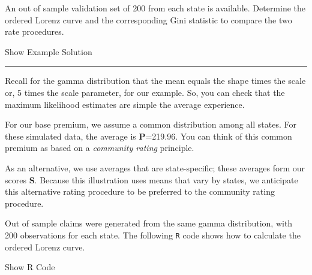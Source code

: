 \documentclass[]{book}
\theoremstyle{definition}
\theoremstyle{definition}
\theoremstyle{definition}
\theoremstyle{remark}
\begin{document}
An out of sample validation set of 200 from each state is available.
Determine the ordered Lorenz curve and the corresponding Gini statistic
to compare the two rate procedures.

Show Example Solution

\hypertarget{toggleExampleLor}{}
\begin{center}\rule{0.5\linewidth}{\linethickness}\end{center}

Recall for the gamma distribution that the mean equals the shape times
the scale or, 5 times the scale parameter, for our example. So, you can
check that the maximum likelihood estimates are simple the average
experience.

For our base premium, we assume a common distribution among all states.
For these simulated data, the average is \textbf{P}=219.96. You can
think of this common premium as based on a \emph{community rating}
principle.

As an alternative, we use averages that are state-specific; these
averages form our scores \textbf{S}. Because this illustration uses
means that vary by states, we anticipate this alternative rating
procedure to be preferred to the community rating procedure.

Out of sample claims were generated from the same gamma distribution,
with 200 observations for each state. The following \texttt{R} code
shows how to calculate the ordered Lorenz curve.

Show R Code
\end{document}
